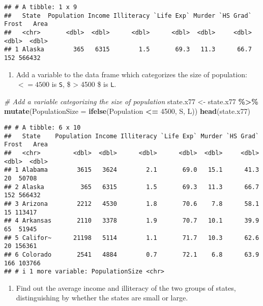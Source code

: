 \documentclass[
]{article}
\newenvironment{Shaded}{\begin{snugshade}}{\end{snugshade}}
\newcommand{\AttributeTok}[1]{\textcolor[rgb]{0.13,0.29,0.53}{#1}}
\newcommand{\CommentTok}[1]{\textcolor[rgb]{0.56,0.35,0.01}{\textit{#1}}}
\newcommand{\DecValTok}[1]{\textcolor[rgb]{0.00,0.00,0.81}{#1}}
\newcommand{\FunctionTok}[1]{\textcolor[rgb]{0.13,0.29,0.53}{\textbf{#1}}}
\newcommand{\NormalTok}[1]{#1}
\newcommand{\OtherTok}[1]{\textcolor[rgb]{0.56,0.35,0.01}{#1}}
\newcommand{\SpecialCharTok}[1]{\textcolor[rgb]{0.81,0.36,0.00}{\textbf{#1}}}
\newcommand{\StringTok}[1]{\textcolor[rgb]{0.31,0.60,0.02}{#1}}
\providecommand{\tightlist}{%
  \setlength{\itemsep}{0pt}\setlength{\parskip}{0pt}}
\begin{document}
\begin{verbatim}
## # A tibble: 1 x 9
##   State  Population Income Illiteracy `Life Exp` Murder `HS Grad` Frost   Area
##   <chr>       <dbl>  <dbl>      <dbl>      <dbl>  <dbl>     <dbl> <dbl>  <dbl>
## 1 Alaska        365   6315        1.5       69.3   11.3      66.7   152 566432
\end{verbatim}

\begin{enumerate}
\def\labelenumi{\alph{enumi}.}
\setcounter{enumi}{2}
\tightlist
\item
  Add a variable to the data frame which categorizes the size of
  population: \(<= 4500\) is \texttt{S}, \$ \textgreater{} 4500 \$ is
  \texttt{L}.
\end{enumerate}

\begin{Shaded}
\begin{Highlighting}[]
\CommentTok{\# Add a variable categorizing the size of population}
\NormalTok{state.x77 }\OtherTok{\textless{}{-}}\NormalTok{ state.x77 }\SpecialCharTok{\%\textgreater{}\%} 
  \FunctionTok{mutate}\NormalTok{(}\AttributeTok{PopulationSize =} \FunctionTok{ifelse}\NormalTok{(Population }\SpecialCharTok{\textless{}=} \DecValTok{4500}\NormalTok{, }\StringTok{\textquotesingle{}S\textquotesingle{}}\NormalTok{, }\StringTok{\textquotesingle{}L\textquotesingle{}}\NormalTok{))}
\FunctionTok{head}\NormalTok{(state.x77)}
\end{Highlighting}
\end{Shaded}

\begin{verbatim}
## # A tibble: 6 x 10
##   State    Population Income Illiteracy `Life Exp` Murder `HS Grad` Frost   Area
##   <chr>         <dbl>  <dbl>      <dbl>      <dbl>  <dbl>     <dbl> <dbl>  <dbl>
## 1 Alabama        3615   3624        2.1       69.0   15.1      41.3    20  50708
## 2 Alaska          365   6315        1.5       69.3   11.3      66.7   152 566432
## 3 Arizona        2212   4530        1.8       70.6    7.8      58.1    15 113417
## 4 Arkansas       2110   3378        1.9       70.7   10.1      39.9    65  51945
## 5 Califor~      21198   5114        1.1       71.7   10.3      62.6    20 156361
## 6 Colorado       2541   4884        0.7       72.1    6.8      63.9   166 103766
## # i 1 more variable: PopulationSize <chr>
\end{verbatim}

\begin{enumerate}
\def\labelenumi{\alph{enumi}.}
\setcounter{enumi}{3}
\tightlist
\item
  Find out the average income and illiteracy of the two groups of
  states, distinguishing by whether the states are small or large.
\end{enumerate}
\end{document}
